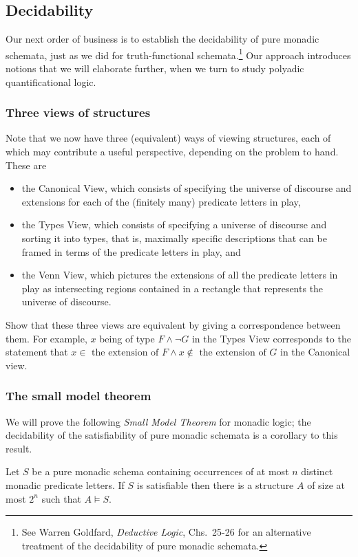 \subsection{Decidability}

Our next order of business is to establish the decidability of pure monadic schemata, just as we did for truth-functional schemata.\footnote{See Warren Goldfard, \emph{Deductive Logic}, Chs.~25-26 for an alternative treatment of the decidability of pure monadic schemata.}
Our approach introduces notions that we will elaborate further, when we turn to study polyadic quantificational logic.

\subsubsection*{Three views of structures}
Note that we now have three (equivalent) ways of viewing structures, each of which may contribute a useful perspective, depending on the problem to hand. These are
\begin{itemize}
\item 
the Canonical View, which consists of specifying the universe of discourse and extensions for each of the (finitely many) predicate letters in play,
\item 
the Types View, which consists of specifying a universe of discourse and sorting it into types, that is, maximally specific descriptions that can be framed in terms of the predicate letters in play, and
\item 
the Venn View, which pictures the extensions of all the predicate letters in play as intersecting regions contained in a rectangle that represents the universe of discourse.
\end{itemize}

\begin{aside}
    Show that these three views are equivalent by giving a correspondence between them. For example, $x$ being of type $F \land \lnot G$ in the Types View corresponds to the statement that $x \in\mbox{ the extension of } F \land x \not \in\mbox{ the extension of } G$ in the Canonical view. 
\end{aside}

\subsubsection*{The small model theorem}
We will prove the following \emph{Small Model Theorem} for monadic logic; the decidability of the satisfiability of pure monadic schemata is a corollary to this result. 
\begin{theorem}\label{smm-thm}
Let $S$ be a pure monadic schema containing occurrences of at most $n$ distinct monadic predicate letters. If $S$ is satisfiable then there is a structure $A$ of size at most $2^n$ such that $A\models S$.
\end{theorem}

